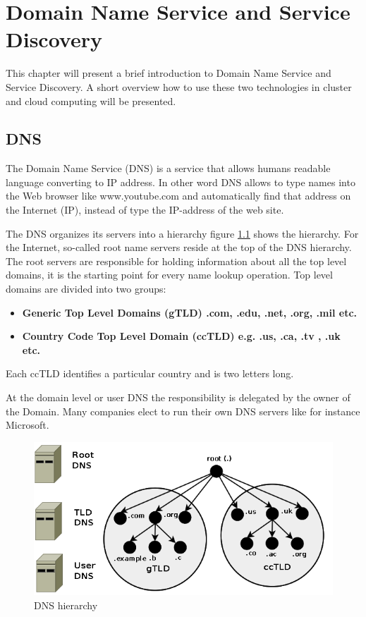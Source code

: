 \chapter{Domain Name Service and Service Discovery}\label{ch:dns}
This chapter will present a brief introduction to Domain Name Service and Service Discovery. A short overview how to use these two technologies in cluster and cloud computing will be presented.
	
\section{DNS}
The Domain Name Service (DNS) is a service that allows humans readable language converting to IP address. In other word DNS allows to type names into the Web browser like www.youtube.com and automatically find that address on the Internet (IP), instead of type the IP-address of the web site.

The DNS organizes its servers into a hierarchy figure \ref{fig:DNShierarchy} shows the hierarchy. For the Internet, so-called root name servers reside at the top of the DNS hierarchy. The root servers are responsible for holding information about all the top level domains, it is the starting point for every name lookup operation. Top level domains are divided into two groups:

\begin{itemize}
	\item \textbf{Generic Top Level Domains (gTLD) .com, .edu, .net, .org, .mil etc.}
	\item \textbf{ Country Code Top Level Domain (ccTLD) e.g. .us, .ca, .tv , .uk etc.}
\end{itemize}
Each ccTLD identifies a particular country and is two letters long.   


At the domain level or user DNS the responsibility is delegated by the owner of the Domain. Many companies elect to run their own DNS servers like for instance Microsoft. 
	

\begin{figure}[bth]
	\includegraphics[width=1\linewidth]{gfx/DNShierarchy}
	\caption[routingtable]{DNS hierarchy} \label{fig:DNShierarchy}
\end{figure}

